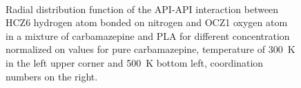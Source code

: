 \begin{figure}[htb!]
	\centering
	\\
	\caption{Radial distribution function of the API-API interaction between HCZ6 hydrogen atom bonded on nitrogen and OCZ1 oxygen atom in a mixture of carbamazepine and PLA for different concentration normalized on values for pure carbamazepine, temperature of 300~K in the left upper corner and 500~K bottom left, coordination numbers on the right.}
	\label{fig:cbz_RDF_}
\end{figure}




